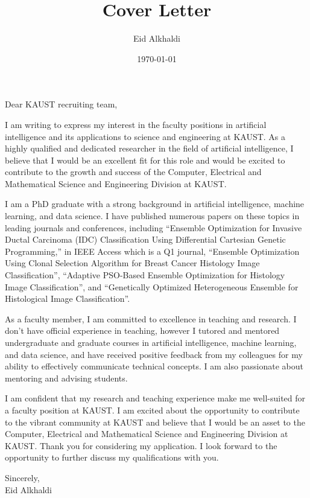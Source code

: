 \documentclass[11pt]{article}
\author{Eid Alkhaldi}
\date{\today}
\title{Cover Letter}
\begin{document}
\maketitle
\noindent
Dear KAUST recruiting team,
\indent

I am writing to express my interest in the faculty positions in artificial intelligence and its applications to science and engineering at KAUST. As a highly qualified and dedicated researcher in the field of artificial intelligence, I believe that I would be an excellent fit for this role and would be excited to contribute to the growth and success of the Computer, Electrical and Mathematical Science and Engineering Division at KAUST.

I am a PhD graduate with a strong background in artificial intelligence, machine learning, and data science. I have published numerous papers on these topics in leading journals and conferences, including “Ensemble Optimization for Invasive Ductal Carcinoma
(IDC) Classification Using Differential Cartesian Genetic Programming,” in IEEE Access which is a Q1 journal, “Ensemble Optimization Using Clonal Selection Algorithm
for Breast Cancer Histology Image Classification”, “Adaptive PSO-Based Ensemble Optimization for Histology Image Classification”, and “Genetically Optimized Heterogeneous Ensemble for Histological Image Classification”. 

As a faculty member, I am committed to excellence in teaching and research. I don't have official experience in teaching, however I tutored and mentored undergraduate and graduate courses in artificial intelligence, machine learning, and data science, and have received positive feedback from my colleagues for my ability to effectively communicate technical concepts. I am also passionate about mentoring and advising students.

I am confident that my research and teaching experience make me well-suited for a faculty position at KAUST. I am excited about the opportunity to contribute to the vibrant community at KAUST and believe that I would be an asset to the Computer, Electrical and Mathematical Science and Engineering Division at KAUST. Thank you for considering my application. I look forward to the opportunity to further discuss my qualifications with you.

\noindent
Sincerely, \\
Eid Alkhaldi
\end{document}
